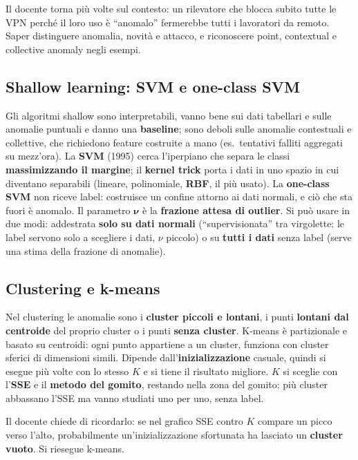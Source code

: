 \begin{esame}
Il docente torna più volte sul contesto: un rilevatore che blocca subito tutte le VPN perché il loro uso
è ``anomalo'' fermerebbe tutti i lavoratori da remoto. Saper distinguere anomalia, novità e attacco, e
riconoscere point, contextual e collective anomaly negli esempi.
\end{esame}

\subsection{Shallow learning: SVM e one-class SVM}
Gli algoritmi shallow sono interpretabili, vanno bene sui dati tabellari e sulle anomalie puntuali e
danno una \textbf{baseline}; sono deboli sulle anomalie contestuali e collettive, che richiedono feature
costruite a mano (es.\ tentativi falliti aggregati su mezz'ora). La \textbf{SVM} (1995) cerca l'iperpiano
che separa le classi \textbf{massimizzando il margine}; il \textbf{kernel trick} porta i dati in uno spazio
in cui diventano separabili (lineare, polinomiale, \textbf{RBF}, il più usato). La \textbf{one-class SVM}
non riceve label: costruisce un confine attorno ai dati normali, e ciò che sta fuori è anomalo. Il
parametro $\bm{\nu}$ è la \textbf{frazione attesa di outlier}. Si può usare in due modi: addestrata
\textbf{solo su dati normali} (``supervisionata'' tra virgolette: le label servono solo a scegliere i
dati, $\nu$ piccolo) o su \textbf{tutti i dati} senza label (serve una stima della frazione di anomalie).

\subsection{Clustering e k-means}
Nel clustering le anomalie sono i \textbf{cluster piccoli e lontani}, i punti \textbf{lontani dal
centroide} del proprio cluster o i punti \textbf{senza cluster}. K-means è partizionale e basato su
centroidi: ogni punto appartiene a un cluster, funziona con cluster sferici di dimensioni simili.
Dipende dall'\textbf{inizializzazione} casuale, quindi si esegue più volte con lo stesso $K$ e si tiene il
risultato migliore. $K$ si sceglie con l'\textbf{SSE} e il \textbf{metodo del gomito}, restando nella
zona del gomito: più cluster abbassano l'SSE ma vanno studiati uno per uno, senza label.

\begin{esame}
Il docente chiede di ricordarlo: se nel grafico SSE contro $K$ compare un picco verso l'alto,
probabilmente un'inizializzazione sfortunata ha lasciato un \textbf{cluster vuoto}. Si riesegue k-means.
\end{esame}


